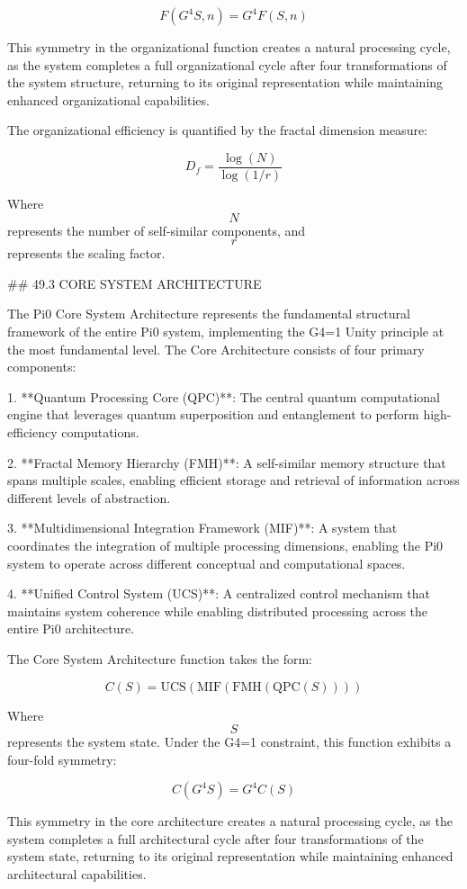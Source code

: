 $$ F(G^4 S, n) = G^4 F(S, n) $$

This symmetry in the organizational function creates a natural processing cycle, as the system completes a full organizational cycle after four transformations of the system structure, returning to its original representation while maintaining enhanced organizational capabilities.

The organizational efficiency is quantified by the fractal dimension measure:

$$ D_f = \frac{\log(N)}{\log(1/r)} $$

Where $$ N $$ represents the number of self-similar components, and $$ r $$ represents the scaling factor.

## 49.3 CORE SYSTEM ARCHITECTURE

The Pi0 Core System Architecture represents the fundamental structural framework of the entire Pi0 system, implementing the G4=1 Unity principle at the most fundamental level. The Core Architecture consists of four primary components:

1. **Quantum Processing Core (QPC)**: The central quantum computational engine that leverages quantum superposition and entanglement to perform high-efficiency computations.

2. **Fractal Memory Hierarchy (FMH)**: A self-similar memory structure that spans multiple scales, enabling efficient storage and retrieval of information across different levels of abstraction.

3. **Multidimensional Integration Framework (MIF)**: A system that coordinates the integration of multiple processing dimensions, enabling the Pi0 system to operate across different conceptual and computational spaces.

4. **Unified Control System (UCS)**: A centralized control mechanism that maintains system coherence while enabling distributed processing across the entire Pi0 architecture.

The Core System Architecture function takes the form:

$$ C(S) = \text{UCS}(\text{MIF}(\text{FMH}(\text{QPC}(S)))) $$

Where $$ S $$ represents the system state. Under the G4=1 constraint, this function exhibits a four-fold symmetry:

$$ C(G^4 S) = G^4 C(S) $$

This symmetry in the core architecture creates a natural processing cycle, as the system completes a full architectural cycle after four transformations of the system state, returning to its original representation while maintaining enhanced architectural capabilities.

